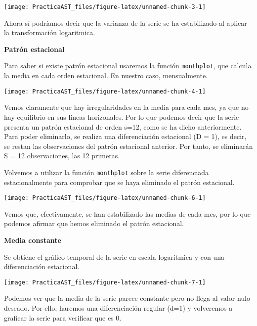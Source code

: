 \documentclass[
]{article}
\begin{document}
\begin{center}\texttt{[image: PracticaAST\_files/figure-latex/unnamed-chunk-3-1]} \end{center}

Ahora sí podríamos decir que la varianza de la serie se ha estabilizado
al aplicar la transformación logaritmica.

\medskip

\textbf{Patrón estacional}

Para saber si existe patrón estacional usaremos la función
\texttt{monthplot}, que calcula la media en cada orden estacional. En
nuestro caso, mensualmente.

\begin{center}\texttt{[image: PracticaAST\_files/figure-latex/unnamed-chunk-4-1]} \end{center}

Vemos claramente que hay irregularidades en la media para cada mes, ya
que no hay equilibrio en sus líneas horizonales. Por lo que podemos
decir que la serie presenta un patrón estacional de orden s=12, como se
ha dicho anteriormente. Para poder eliminarlo, se realiza una
diferenciación estacional (D = 1), es decir, se restan las observaciones
del patrón estacional anterior. Por tanto, se eliminarán S = 12
observaciones, las 12 primeras.

Volvemos a utilizar la función \texttt{monthplot} sobre la serie
diferenciada estacionalmente para comprobar que se haya eliminado el
patrón estacional.

\begin{center}\texttt{[image: PracticaAST\_files/figure-latex/unnamed-chunk-6-1]} \end{center}

Vemos que, efectivamente, se han estabilizado las medias de cada mes,
por lo que podemos afirmar que hemos eliminado el patrón estacional.

\medskip

\textbf{Media constante}

Se obtiene el gráfico temporal de la serie en escala logarítmica y con
una diferenciación estacional.

\begin{center}\texttt{[image: PracticaAST\_files/figure-latex/unnamed-chunk-7-1]} \end{center}

Podemos ver que la media de la serie parece constante pero no llega al
valor nulo deseado. Por ello, haremos una diferenciación regular (d=1) y
volveremos a graficar la serie para verificar que es 0.
\end{document}
